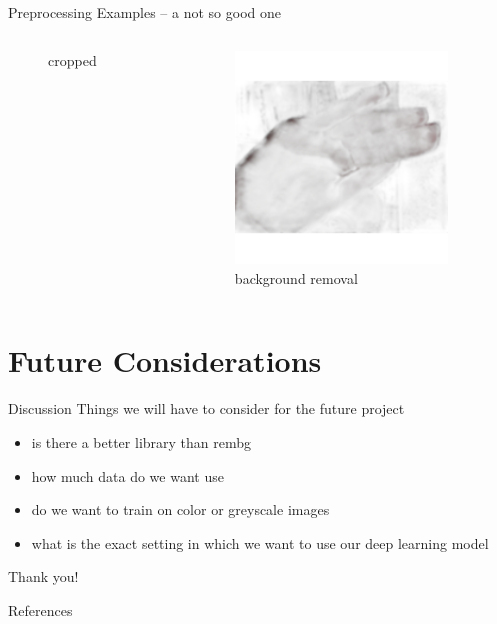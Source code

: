 \documentclass[aspectratio=169]{beamer}
\newcommand{\nologo}{\setbeamertemplate{logo}{}} %
\begin{document}
{\begin{frame}{Preprocessing Examples -- a not so good one}
\begin{columns}[c]
\begin{column}{.33\textwidth}
\begin{figure}
        \caption{cropped}
    \end{figure}
    \end{column}
    
    \begin{column}{.33\textwidth}
    \begin{figure}
        \centering
        \includegraphics[width=0.9\textwidth]{img/rembg/nasmi_304.png}
        \caption{background removal}
    \end{figure}
    \end{column}
\end{columns}
\end{frame}

\section{Future Considerations}
	\begin{frame}{Discussion}
	Things we will have to consider for the future project
	\begin{itemize}
		\item is there a better library than rembg
		\item how much data do we want use
		\item do we want to train on color or greyscale images
		\item what is the exact setting in which we want to use our deep learning model
	\end{itemize}
	\end{frame}
}



\appendix
{\nologo
	\begin{frame}[standout]
		Thank you!
	\end{frame}

    
	\begin{frame}[allowframebreaks]{References}
	
	
  	
  	

	\end{frame}
}
\end{document}
